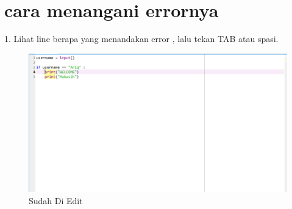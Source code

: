 \documentclass{article}
\begin{document}
\\
\\
\\
\\
\\
\\
\\
\\
\\
\section{cara menangani errornya}
1. Lihat line berapa yang menandakan error , lalu tekan TAB atau spasi.
\begin{figure}[h]
	\centering
		\includegraphics[scale=0.4]{Gambar/E3}
	\caption{Sudah Di Edit}
\end{figure}
\end{document}
